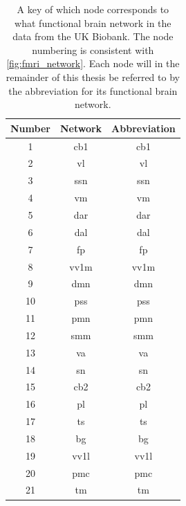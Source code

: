 \begin{table}[!htbp]
    \centering
    \caption{A key of which node corresponds to what functional brain network in the data from the UK Biobank. The node numbering is consistent with \cref{fig:fmri_network}. Each node will in the remainder of this thesis be referred to by the abbreviation for its functional brain network.}
    \begin{tabular}{||c|c|c||}
        \hline
        Number & Network & Abbreviation  \\ \hline\hline
        1 & \acrlong{cb1} & \acrshort{cb1} \\ \hline
        2 & \acrlong{vl} & \acrshort{vl}  \\ \hline
        3 & \acrlong{ssn} & \acrshort{ssn} \\ \hline
        4 & \acrlong{vm} &  \acrshort{vm}\\ \hline
        5 & \acrlong{dar} & \acrshort{dar} \\ \hline
        6 & \acrlong{dal} &  \acrshort{dal} \\ \hline
        7 & \acrlong{fp} &  \acrshort{fp}\\ \hline
        8 & \acrlong{vv1m} & \acrshort{vv1m} \\ \hline
        9 & \acrlong{dmn} &  \acrshort{dmn} \\ \hline
        10 & \acrlong{pss} & \acrshort{pss} \\ \hline
        11 & \acrlong{pmn} & \acrshort{pmn} \\ \hline
        12 & \acrlong{smm} & \acrshort{smm}  \\ \hline
        13 & \acrlong{va} &  \acrshort{va}\\ \hline
        14 & \acrlong{sn} &  \acrshort{sn}\\ \hline
        15 & \acrlong{cb2} & \acrshort{cb2} \\ \hline
        16 & \acrlong{pl} & \acrshort{pl} \\ \hline
        17 & \acrlong{ts} & \acrshort{ts} \\ \hline
        18 & \acrlong{bg} &  \acrshort{bg} \\ \hline
        19 & \acrlong{vv1l} & \acrshort{vv1l} \\ \hline
        20 & \acrlong{pmc} & \acrshort{pmc} \\ \hline
        21 & \acrlong{tm} & \acrshort{tm} \\ \hline
    \end{tabular}
    \label{tab:Networks}
\end{table}


